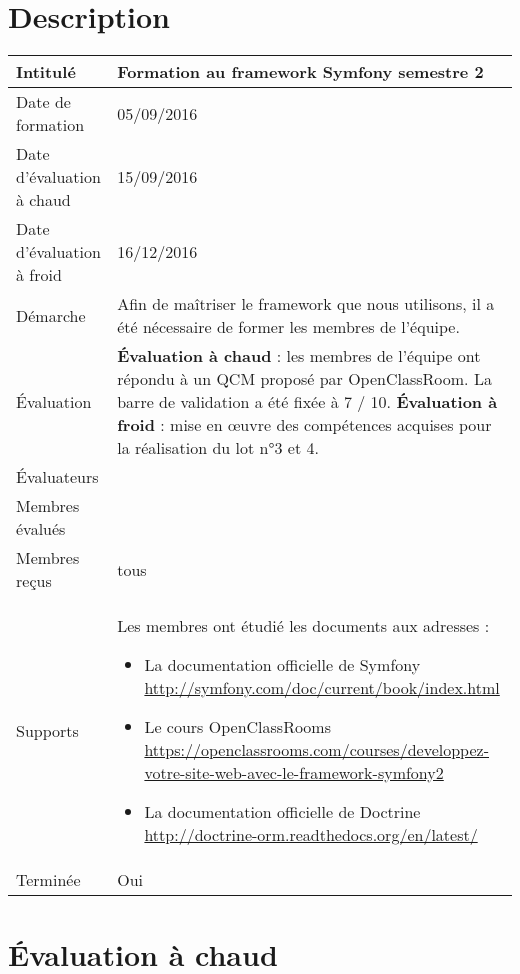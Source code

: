 \documentclass[asi, sansVersion]{picInsa}
\begin{document}
	\section*{Description}
		\begin{longtable}{|p{}|p{}|}
			\hline
			\cellcolor{gris2} Intitulé & Formation au framework Symfony semestre 2\\\hline
			\cellcolor{gris2} Date de formation & 05/09/2016\\\hline
			\cellcolor{gris2} Date d'évaluation à chaud & 15/09/2016 \\\hline
			\cellcolor{gris2} Date d'évaluation à froid & 16/12/2016 \\\hline
			\cellcolor{gris2} Démarche & Afin de maîtriser le framework que nous utilisons, il a été nécessaire de former les membres de l'équipe.\\\hline
			\cellcolor{gris2} Évaluation &
				\textbf{Évaluation à chaud} : les membres de l'équipe ont répondu à un QCM proposé par OpenClassRoom. La barre de validation a été fixée à 7 / 10.\newline
				\textbf{Évaluation à froid} : mise en œuvre des compétences acquises pour la réalisation du lot n°3 et 4.\\\hline
			\cellcolor{gris2} Évaluateurs & \Florian{}\\\hline
			\cellcolor{gris2} Membres évalués & \Francois{} \Juliana{}\\\hline
			\cellcolor{gris2} Membres reçus & tous \\\hline
			\cellcolor{gris2} Supports & Les membres ont étudié les documents aux adresses : \begin{itemize}
			\item La documentation officielle de Symfony \url{http://symfony.com/doc/current/book/index.html}
                        \item Le cours OpenClassRooms \url{https://openclassrooms.com/courses/developpez-votre-site-web-avec-le-framework-symfony2}
                        \item La documentation officielle de Doctrine \url{http://doctrine-orm.readthedocs.org/en/latest/}
		\end{itemize}
			 \\\hline
			\cellcolor{gris2} Terminée & Oui \\\hline
		\end{longtable}
		\newpage
	\section*{Évaluation à chaud}
\end{document}
